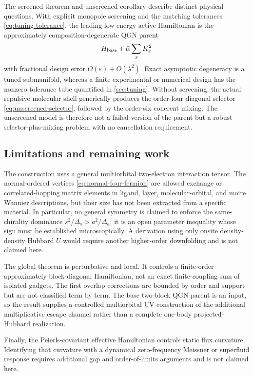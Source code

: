 \documentclass[11pt]{article}
\theoremstyle{definition}
\theoremstyle{remark}
\begin{document}
The screened theorem and unscreened corollary describe distinct physical questions.  With explicit monopole screening and the matching tolerances \eqref{eq:tuning-tolerance}, the leading low-energy active Hamiltonian is the approximately composition-degenerate QGN parent
\begin{equation}
 H_{\rm base}+\bar\alpha\sum_xK_x^2
\end{equation}
with fractional design error $O(\varepsilon)+O(\lambda^2)$.  Exact asymptotic degeneracy is a tuned submanifold, whereas a finite experimental or numerical design has the nonzero tolerance tube quantified in \cref{sec:tuning}.  Without screening, the actual repulsive molecular shell generically produces the order-four diagonal selector \eqref{eq:unscreened-selector}, followed by the order-six coherent mixing.  The unscreened model is therefore not a failed version of the parent but a robust selector-plus-mixing problem with no cancellation requirement.

\subsection{Limitations and remaining work}

The construction uses a general multiorbital two-electron interaction tensor.  The normal-ordered vertices \eqref{eq:normal-four-fermion} are allowed exchange or correlated-hopping matrix elements in ligand, layer, molecular-orbital, and moire Wannier descriptions, but their size has not been extracted from a specific material.  In particular, no general symmetry is claimed to enforce the same-chirality dominance $s^2/\bar\Delta_s>a^2/\bar\Delta_a$; it is an open parameter inequality whose sign must be established microscopically.  A derivation using only onsite density-density Hubbard $U$ would require another higher-order downfolding and is not claimed here.

The global theorem is perturbative and local.  It controls a finite-order approximately block-diagonal Hamiltonian, not an exact finite-coupling sum of isolated gadgets.  The first overlap corrections are bounded by order and support but are not classified term by term.  The base two-block QGN parent is an input, so the result supplies a controlled multiorbital UV construction of the additional multiplicative escape channel rather than a complete one-body projected-Hubbard realization.

Finally, the Peierls-covariant effective Hamiltonian controls static flux curvature.  Identifying that curvature with a dynamical zero-frequency Meissner or superfluid response requires additional gap and order-of-limits arguments and is not claimed here.
\end{document}
